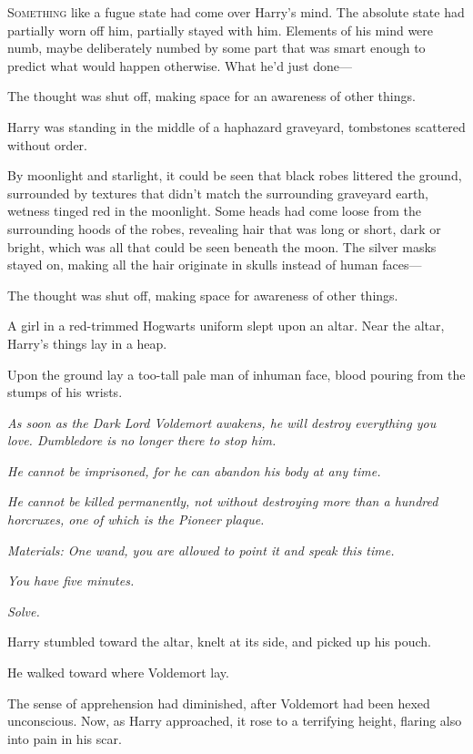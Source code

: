 
\lettrine{S}{omething} like a fugue state had come over Harry's mind. The absolute state had partially worn off him, partially stayed with him. Elements of his mind were numb, maybe deliberately numbed by some part that was smart enough to predict what would happen otherwise. What he'd just done—

The thought was shut off, making space for an awareness of other things.

Harry was standing in the middle of a haphazard graveyard, tombstones scattered without order.

By moonlight and starlight, it could be seen that black robes littered the ground, surrounded by textures that didn't match the surrounding graveyard earth, wetness tinged red in the moonlight. Some heads had come loose from the surrounding hoods of the robes, revealing hair that was long or short, dark or bright, which was all that could be seen beneath the moon. The silver masks stayed on, making all the hair originate in skulls instead of human faces—

The thought was shut off, making space for awareness of other things.

A girl in a red-trimmed Hogwarts uniform slept upon an altar. Near the altar, Harry's things lay in a heap.

Upon the ground lay a too-tall pale man of inhuman face, blood pouring from the stumps of his wrists.

\emph{As soon as the Dark Lord Voldemort awakens, he will destroy everything you love. Dumbledore is no longer there to stop him.}

\emph{He cannot be imprisoned, for he can abandon his body at any time.}

\emph{He cannot be killed permanently, not without destroying more than a hundred horcruxes, one of which is the Pioneer plaque.}

\emph{Materials: One wand, you are allowed to point it and speak this time.}

\emph{You have five minutes.}

\emph{Solve.}

Harry stumbled toward the altar, knelt at its side, and picked up his pouch.

He walked toward where Voldemort lay.

The sense of apprehension had diminished, after Voldemort had been hexed unconscious. Now, as Harry approached, it rose to a terrifying height, flaring also into pain in his scar.

